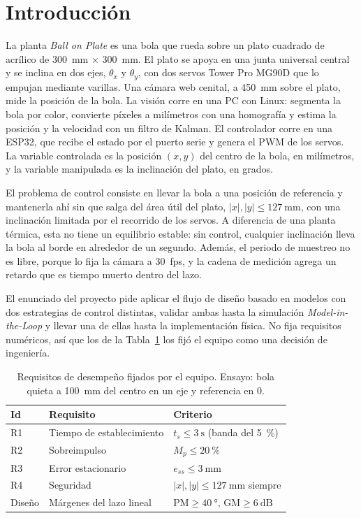 \section{Introducción}

La planta \emph{Ball on Plate} es una bola que rueda sobre un plato cuadrado de acrílico de
\SI{300}{\milli\metre} $\times$ \SI{300}{\milli\metre}. El plato se apoya en una junta universal central y se inclina en
dos ejes, $\theta_x$ y $\theta_y$, con dos servos Tower Pro MG90D que lo empujan mediante
varillas. Una cámara web cenital, a \SI{450}{\milli\metre} sobre el plato, mide la posición de
la bola. La visión corre en una PC con Linux: segmenta la bola por color, convierte píxeles a
milímetros con una homografía y estima la posición y la velocidad con un filtro de Kalman. El
controlador corre en una ESP32, que recibe el estado por el puerto serie y genera el PWM de los
servos. La variable controlada es la posición $(x, y)$ del centro de la bola, en milímetros, y
la variable manipulada es la inclinación del plato, en grados.

El problema de control consiste en llevar la bola a una posición de referencia y mantenerla ahí
sin que salga del área útil del plato, $|x|, |y| \le \SI{127}{\milli\metre}$, con una inclinación
limitada por el recorrido de los servos. A diferencia de una planta térmica, esta no tiene un
equilibrio estable: sin control, cualquier inclinación lleva la bola al borde en alrededor de un
segundo. Además, el periodo de muestreo no es libre, porque lo fija la cámara a
\SI{30}{fps}, y la cadena de medición agrega un retardo que es tiempo muerto dentro del lazo.

El enunciado del proyecto pide aplicar el flujo de diseño basado en modelos con dos
estrategias de control distintas, validar ambas hasta la simulación \emph{Model-in-the-Loop} y
llevar una de ellas hasta la implementación física. No fija requisitos numéricos, así que los de
la Tabla~\ref{tab:requisitos} los fijó el equipo como una decisión de ingeniería.

\begin{table}[!t]
\caption{Requisitos de desempeño fijados por el equipo. Ensayo: bola quieta a
\SI{100}{\milli\metre} del centro en un eje y referencia en 0.}
\label{tab:requisitos}
\centering
\footnotesize
\setlength{\tabcolsep}{4pt}
\begin{tabular}{@{}lll@{}}
\toprule
\textbf{Id} & \textbf{Requisito} & \textbf{Criterio} \\
\midrule
R1 & Tiempo de establecimiento & $t_s \le \SI{3}{\second}$ (banda del \SI{5}{\percent}) \\
R2 & Sobreimpulso & $M_p \le \SI{20}{\percent}$ \\
R3 & Error estacionario & $e_{ss} \le \SI{3}{\milli\metre}$ \\
R4 & Seguridad & $|x|, |y| \le \SI{127}{\milli\metre}$ siempre \\
Diseño & Márgenes del lazo lineal & $\mathrm{PM} \ge \SI{40}{\degree}$, $\mathrm{GM} \ge \SI{6}{\deci\bel}$ \\
\bottomrule
\end{tabular}
\end{table}

